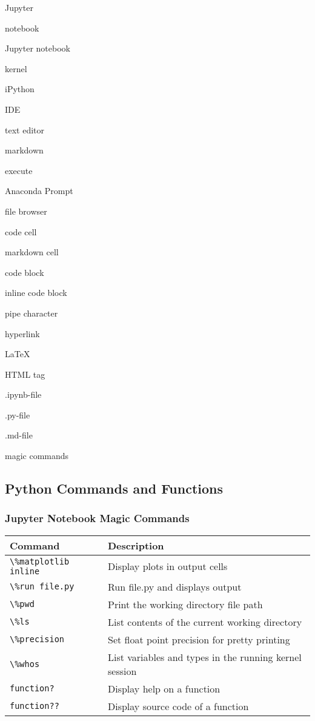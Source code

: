 \documentclass{book}
\newenvironment{key_terms}{\begin{multicols}{3}}{\end{multicols}} %
\newcommand{\passthrough}[1]{#1}
\begin{document}
    
        \begin{key_terms}
        Jupyter

notebook

Jupyter notebook

kernel

iPython

IDE

text editor

markdown

execute

Anaconda Prompt

file browser

code cell

markdown cell

code block

inline code block

pipe character

hyperlink

LaTeX

HTML tag

.ipynb-file

.py-file

.md-file

magic commands
        \end{key_terms}

    




    
        \hypertarget{python-commands-and-functions}{%
\subsection{Python Commands and
Functions}\label{python-commands-and-functions}}
    




    
        \hypertarget{jupyter-notebook-magic-commands}{%
\subsubsection{Jupyter Notebook Magic
Commands}\label{jupyter-notebook-magic-commands}}

\begin{longtable}[]{@{}ll@{}}
\toprule
Command & Description\tabularnewline
\midrule
\endhead
\passthrough{\lstinline!\%matplotlib inline!} & Display plots in output
cells\tabularnewline
\passthrough{\lstinline!\%run file.py!} & Run file.py and displays
output\tabularnewline
\passthrough{\lstinline!\%pwd!} & Print the working directory file
path\tabularnewline
\passthrough{\lstinline!\%ls!} & List contents of the current working
directory\tabularnewline
\passthrough{\lstinline!\%precision!} & Set float point precision for
pretty printing\tabularnewline
\passthrough{\lstinline!\%whos!} & List variables and types in the
running kernel session\tabularnewline
\passthrough{\lstinline!function?!} & Display help on a
function\tabularnewline
\passthrough{\lstinline!function??!} & Display source code of a
function\tabularnewline
\bottomrule
\end{longtable}
    
\end{document}
